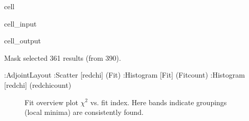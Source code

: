 \documentclass[letterpaper,table,10pt,english]{jupyterBook}
\begin{document}
\begin{sphinxuseclass}{cell}\begin{sphinxVerbatimInput}

\begin{sphinxuseclass}{cell_input}
\begin{sphinxVerbatim}[commandchars=\\\{\}]


 

\PYG{p}{[}\PYG{p}{]}\PYG{p}{[}\PYG{p}{]}
\end{sphinxVerbatim}

\end{sphinxuseclass}\end{sphinxVerbatimInput}
\begin{sphinxVerbatimOutput}

\begin{sphinxuseclass}{cell_output}
\begin{sphinxVerbatim}[commandchars=\\\{\}]
Mask selected 361 results (from 390).
\end{sphinxVerbatim}

\begin{sphinxVerbatim}[commandchars=\\\{\}]
:AdjointLayout
   :Scatter   [redchi]   (Fit)
   :Histogram   [Fit]   (Fit\PYGZus{}count)
   :Histogram   [redchi]   (redchi\PYGZus{}count)
\end{sphinxVerbatim}

\end{sphinxuseclass}\end{sphinxVerbatimOutput}

\end{sphinxuseclass}
\begin{figure}[htbp]
\centering
\capstart

\noindent{}
\caption{Fit overview plot \sphinxhyphen{} \(\chi^2\) vs. fit index. Here bands indicate groupings (local minima) are consistently found.}\label{\detokenize{part2/case-study-C2H4_290723:fig-c2h4-fithist}}\end{figure}
\end{document}

